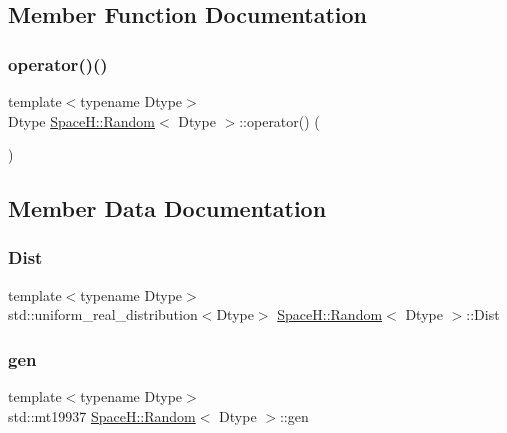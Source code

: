 \subsection{Member Function Documentation}
\mbox{\label{class_space_h_1_1_random_a12e686912fc85070505209f69d006c51}} 
\subsubsection{\texorpdfstring{operator()()}{operator()()}}
{\footnotesize\ttfamily template$<$typename Dtype$>$ \\
Dtype \mbox{\hyperlink{class_space_h_1_1_random}{Space\+H\+::\+Random}}$<$ Dtype $>$\+::operator() (\begin{DoxyParamCaption}{ }\end{DoxyParamCaption})\hspace{0.3cm}{\ttfamily [inline]}}



\subsection{Member Data Documentation}
\mbox{\label{class_space_h_1_1_random_a521984ba642735af9e3251b292cb7863}} 
\subsubsection{\texorpdfstring{Dist}{Dist}}
{\footnotesize\ttfamily template$<$typename Dtype$>$ \\
std\+::uniform\+\_\+real\+\_\+distribution$<$Dtype$>$ \mbox{\hyperlink{class_space_h_1_1_random}{Space\+H\+::\+Random}}$<$ Dtype $>$\+::Dist}

\mbox{\label{class_space_h_1_1_random_aeff0adf149520c41dd78f602d5c0820f}} 
\subsubsection{\texorpdfstring{gen}{gen}}
{\footnotesize\ttfamily template$<$typename Dtype$>$ \\
std\+::mt19937 \mbox{\hyperlink{class_space_h_1_1_random}{Space\+H\+::\+Random}}$<$ Dtype $>$\+::gen}

